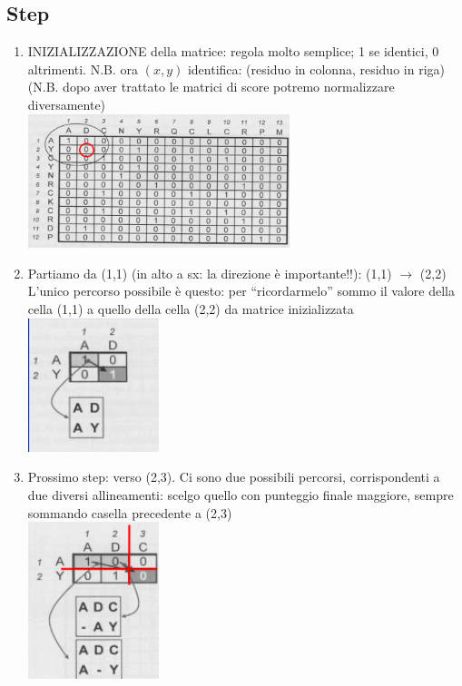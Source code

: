 \documentclass{article}
\begin{document}
\subsection{Step}
\begin{enumerate}
    \item INIZIALIZZAZIONE della matrice: regola molto semplice; 1
    se identici, 0 altrimenti. N.B. ora $(x,y)$ identifica: (residuo in
    colonna, residuo in riga) (N.B. dopo aver trattato le matrici
    di score potremo normalizzare diversamente)\\
    \includegraphics[width=0.6\textwidth]{figures/init.png}
    \item Partiamo da (1,1) (in alto a sx:
    la direzione è importante!!):
    (1,1) $\rightarrow$ (2,2)
    L’unico percorso possibile è
    questo: per “ricordarmelo”
    sommo il valore della cella
    (1,1) a quello della cella (2,2)
    da matrice inizializzata
    \includegraphics[width=0.3\textwidth]{figures/due.png}
    \item Prossimo step: verso (2,3). Ci sono due possibili percorsi, corrispondenti a due diversi
    allineamenti: scelgo quello con punteggio finale maggiore, sempre sommando casella precedente a (2,3)\\
    \includegraphics[width=0.3\textwidth]{figures/tre.png}

\end{enumerate}
\end{document}
